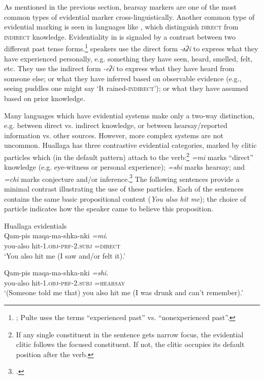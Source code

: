 As mentioned in the previous section, hearsay markers are one of the most common types of evidential marker cross-linguistically. Another common type of evidential marking is seen in languages like , which distinguish \textsc{direct} from \textsc{indirect} knowledge. Evidentiality in  is signaled by a contrast between two different past tense forms.\footnote{\citet{Pulte1985}; Pulte uses the terms “experienced past” vs. “nonexperienced past”.}  speakers use the direct form \textit{-ʌʔi} to express what they have experienced personally, e.g. something they have seen, heard, smelled, felt, etc. They use the indirect form \textit{-eʔi} to express what they have heard from someone else; or what they have inferred based on observable evidence (e.g., seeing puddles one might say ‘It rained-\textsc{indirect}’); or what they have assumed based on prior knowledge.



Many languages which have evidential systems make only a two-way distinction, e.g. between direct vs. indirect knowledge, or between hearsay/reported information vs. other sources. However, more complex systems are not uncommon. Huallaga  has three contrastive evidential categories, marked by clitic particles which (in the default pattern) attach to the verb:\footnote{If any single constituent in the sentence gets narrow focus, the evidential clitic follows the focused constituent. If not, the clitic occupies its default position after the verb.} \textit{=mi} marks “direct” knowledge (e.g. eye-witness or personal experience); \textit{=shi} marks hearsay; and \textit{=chi} marks conjecture and/or inference.\footnote{\citet{Weber1989}.} The following sentences provide a minimal contrast illustrating the use of these particles. Each of the sentences contains the same basic propositional content (\textit{You also hit me}); the choice of particle indicates how the speaker came to believe this proposition.


\ea \label{ex:17.2}

   {Huallaga  evidentials} \citep[421]{Weber1989}\\
\ea 
\gll Qam-pis  maqa-ma-shka-nki  \textit{=mi}.\\
you-also  hit-1\textsc{.obj}-\textsc{prf-2.subj}  \textsc{=direct}\\
\glt ‘You also hit me (I saw and/or felt it).’

\ex \gll Qam-pis  maqa-ma-shka-nki  \textit{=shi}.\\
you-also  hit-1\textsc{.obj}-\textsc{prf-2.subj}  \textsc{=hearsay}\\
\glt ‘(Someone told me that) you also hit me (I was drunk and can’t remember).’

